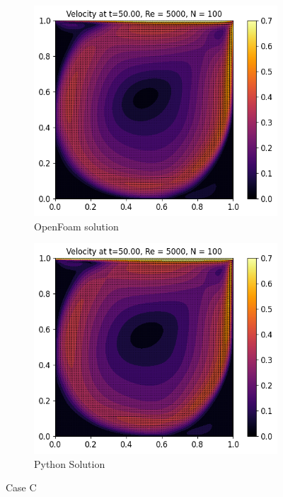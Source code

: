 \documentclass[10pt]{report}
\begin{document}
\begin{figure}[H]
    \centering
    \begin{subfigure}[b]{0.475\textwidth}
        \centering
        \includegraphics[width=\textwidth]{plots/velocity_RE5000_OF.png}
        \caption{OpenFoam solution}
        \label{caseCof}
    \end{subfigure}
    \hfill
    \begin{subfigure}[b]{0.475\textwidth}
        \centering
        \includegraphics[width=\textwidth]{plots/velocity_RE5000.png}
        \caption{Python Solution}
        \label{caseCpy}
    \end{subfigure}
    \caption{Case C}
    \label{caseC}
\end{figure}
\end{document}
